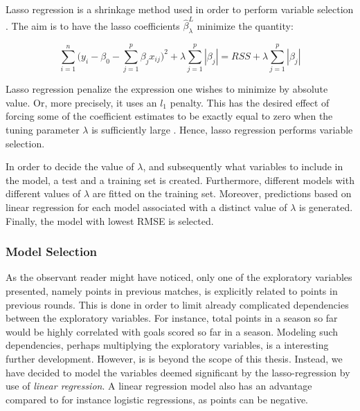 Lasso regression is a shrinkage method used in order to perform variable selection \citep{ISLR}. The aim is to have the lasso coefficients $\hat{\beta}_{\lambda}^{L}$ minimize the quantity:

\begin{equation*}
    \sum_{i=1}^n\Big (y_i-\beta_0-\sum_{j=1}^p\beta_jx_{ij}\Big)^2 + \lambda \sum_{j=1}^p|\beta_j| = RSS + \lambda \sum_{j=1}^p|\beta_j|
\end{equation*}

Lasso regression penalize the expression one wishes to minimize by absolute value. Or, more precisely, it uses an $l_1$ penalty. This has the desired effect of forcing some of the coefficient estimates to be exactly equal to zero when the tuning parameter $\lambda$ is sufficiently large \citep{ISLR}. Hence, lasso regression performs variable selection.\newpar 

In order to decide the value of $\lambda$, and subsequently what variables to include in the model, a test and a training set is created. Furthermore, different models with different values of $\lambda$ are fitted on the training set. Moreover, predictions based on linear regression for each model associated with a distinct value of $\lambda$ is generated. Finally, the model with lowest RMSE is selected.

\subsubsection{Model Selection}

As the observant reader might have noticed, only one of the exploratory variables presented, namely points in previous matches, is explicitly related to points in previous rounds. This is done in order to limit already complicated dependencies between the exploratory variables. For instance, total points in a season so far would be highly correlated with goals scored so far in a season. Modeling such dependencies, perhaps multiplying the exploratory variables, is a interesting further development. However, is is beyond the scope of this thesis. Instead, we have decided to model the variables deemed significant by the lasso-regression by use of \textit{linear regression}. A linear regression model also has an advantage compared to for instance logistic regressions, as points can be negative.



